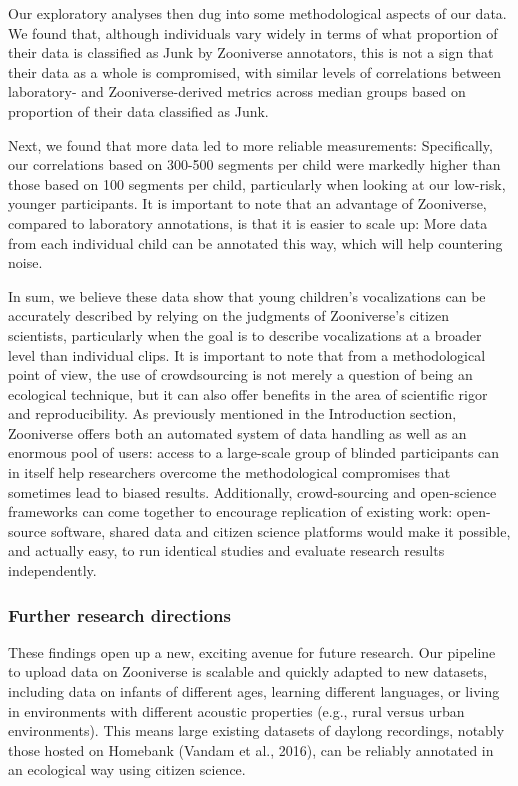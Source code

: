 \documentclass[english,,man,floatsintext]{apa6}
\begin{document}
Our exploratory analyses then dug into some methodological aspects of our data. We found that, although individuals vary widely in terms of what proportion of their data is classified as Junk by Zooniverse annotators, this is not a sign that their data as a whole is compromised, with similar levels of correlations between laboratory- and Zooniverse-derived metrics across median groups based on proportion of their data classified as Junk.

Next, we found that more data led to more reliable measurements: Specifically, our correlations based on 300-500 segments per child were markedly higher than those based on 100 segments per child, particularly when looking at our low-risk, younger participants. It is important to note that an advantage of Zooniverse, compared to laboratory annotations, is that it is easier to scale up: More data from each individual child can be annotated this way, which will help countering noise.

In sum, we believe these data show that young children's vocalizations can be accurately described by relying on the judgments of Zooniverse's citizen scientists, particularly when the goal is to describe vocalizations at a broader level than individual clips. It is important to note that from a methodological point of view, the use of crowdsourcing is not merely a question of being an ecological technique, but it can also offer benefits in the area of scientific rigor and reproducibility. As previously mentioned in the Introduction section, Zooniverse offers both an automated system of data handling as well as an enormous pool of users: access to a large-scale group of blinded participants can in itself help researchers overcome the methodological compromises that sometimes lead to biased results. Additionally, crowd-sourcing and open-science frameworks can come together to encourage replication of existing work: open-source software, shared data and citizen science platforms would make it possible, and actually easy, to run identical studies and evaluate research results independently.

\hypertarget{further-research-directions}{%
\subsubsection{Further research directions}\label{further-research-directions}}

These findings open up a new, exciting avenue for future research. Our pipeline to upload data on Zooniverse is scalable and quickly adapted to new datasets, including data on infants of different ages, learning different languages, or living in environments with different acoustic properties (e.g., rural versus urban environments). This means large existing datasets of daylong recordings, notably those hosted on Homebank (Vandam et al., 2016), can be reliably annotated in an ecological way using citizen science.
\end{document}
